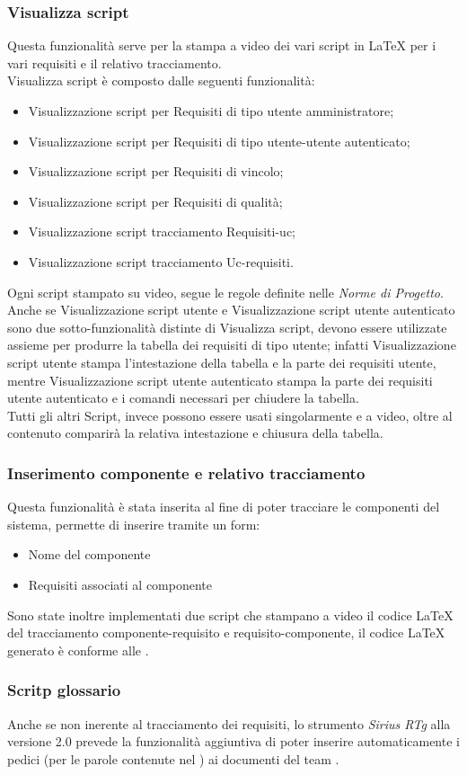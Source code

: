 \subsubsection{Visualizza script}
Questa funzionalità serve per la stampa a video dei vari script in \LaTeX{} per i vari requisiti e il relativo tracciamento.\\ Visualizza script è composto dalle seguenti funzionalità:
	\begin{itemize}
		\item Visualizzazione script per Requisiti di tipo utente amministratore;
		\item Visualizzazione script per Requisiti di tipo utente-utente autenticato;
		\item Visualizzazione script per Requisiti di vincolo;
		\item Visualizzazione script per Requisiti di qualità;
		\item Visualizzazione script tracciamento Requisiti-uc;
		\item Visualizzazione script tracciamento Uc-requisiti.
	\end{itemize}
Ogni script stampato su video, segue le regole definite nelle \textit{Norme di Progetto}.\\
Anche se Visualizzazione script utente e Visualizzazione script utente autenticato sono due sotto-funzionalità distinte di Visualizza script, devono essere utilizzate assieme per produrre la tabella dei requisiti di tipo utente; infatti Visualizzazione script utente stampa l'intestazione della tabella e la parte dei requisiti utente, mentre Visualizzazione script utente autenticato stampa la parte dei requisiti utente autenticato e i comandi necessari per chiudere la tabella.\\
Tutti gli altri Script, invece possono essere usati singolarmente e a video, oltre al contenuto comparirà la relativa intestazione e chiusura della tabella.
\subsubsection{Inserimento componente e relativo tracciamento}
Questa funzionalità è stata inserita al fine di poter tracciare le componenti del sistema, permette di inserire tramite un form:
\begin{itemize}
\item Nome del componente
\item Requisiti associati al componente
\end{itemize}
Sono state inoltre implementati due script che stampano a video il codice \LaTeX{} del tracciamento componente-requisito e requisito-componente, il codice \LaTeX{} generato è conforme alle \NormeDiProgetto{}.
\subsubsection{Scritp glossario}
Anche se non inerente al tracciamento dei requisiti, lo strumento \textit{Sirius RTg} alla versione 2.0 prevede la funzionalità aggiuntiva di poter inserire automaticamente i pedici  (per le parole contenute nel \Glossario{}) ai documenti del team \team.